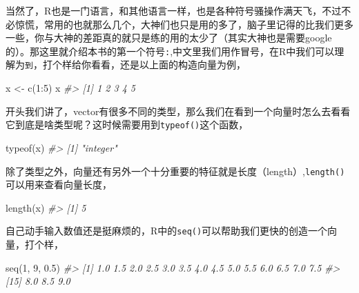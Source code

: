 \documentclass[
]{book}
\newenvironment{Shaded}{\begin{snugshade}}{\end{snugshade}}
\newcommand{\CommentTok}[1]{\textcolor[rgb]{0.56,0.35,0.01}{\textit{#1}}}
\newcommand{\DecValTok}[1]{\textcolor[rgb]{0.00,0.00,0.81}{#1}}
\newcommand{\FloatTok}[1]{\textcolor[rgb]{0.00,0.00,0.81}{#1}}
\newcommand{\FunctionTok}[1]{\textcolor[rgb]{0.00,0.00,0.00}{#1}}
\newcommand{\NormalTok}[1]{#1}
\newcommand{\OtherTok}[1]{\textcolor[rgb]{0.56,0.35,0.01}{#1}}
\newcommand{\SpecialCharTok}[1]{\textcolor[rgb]{0.00,0.00,0.00}{#1}}
\begin{document}
当然了，R也是一门语言，和其他语言一样，也是各种符号骚操作满天飞，不过不必惊慌，常用的也就那么几个，大神们也只是用的多了，脑子里记得的比我们更多一些，你与大神的差距真的就只是练的用的太少了（其实大神也是需要google的）。那这里就介绍本书的第一个符号\texttt{:},中文里我们用作冒号，在R中我们可以理解为\texttt{到}，打个样给你看看，还是以上面的构造向量为例，

\begin{Shaded}
\begin{Highlighting}[]
\NormalTok{x }\OtherTok{\textless{}{-}} \FunctionTok{c}\NormalTok{(}\DecValTok{1}\SpecialCharTok{:}\DecValTok{5}\NormalTok{)}
\NormalTok{x}
\CommentTok{\#\textgreater{} [1] 1 2 3 4 5}
\end{Highlighting}
\end{Shaded}

开头我们讲了，vector有很多不同的类型，那么我们在看到一个向量时怎么去看看它到底是啥类型呢？这时候需要用到\texttt{typeof()}这个函数，

\begin{Shaded}
\begin{Highlighting}[]
\FunctionTok{typeof}\NormalTok{(x)}
\CommentTok{\#\textgreater{} [1] "integer"}
\end{Highlighting}
\end{Shaded}

除了类型之外，向量还有另外一个十分重要的特征就是长度（length）,\texttt{length()}可以用来查看向量长度，

\begin{Shaded}
\begin{Highlighting}[]
\FunctionTok{length}\NormalTok{(x)}
\CommentTok{\#\textgreater{} [1] 5}
\end{Highlighting}
\end{Shaded}

自己动手输入数值还是挺麻烦的，R中的\texttt{seq()}可以帮助我们更快的创造一个向量，打个样，

\begin{Shaded}
\begin{Highlighting}[]
\FunctionTok{seq}\NormalTok{(}\DecValTok{1}\NormalTok{, }\DecValTok{9}\NormalTok{, }\FloatTok{0.5}\NormalTok{)}
\CommentTok{\#\textgreater{}  [1] 1.0 1.5 2.0 2.5 3.0 3.5 4.0 4.5 5.0 5.5 6.0 6.5 7.0 7.5}
\CommentTok{\#\textgreater{} [15] 8.0 8.5 9.0}
\end{Highlighting}
\end{Shaded}
\end{document}
